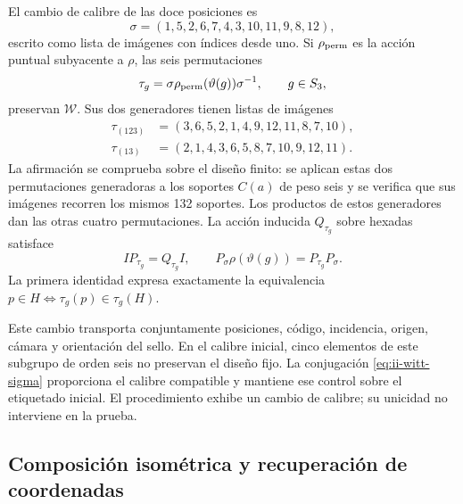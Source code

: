 El cambio de calibre de las doce posiciones es
\begin{equation}
 \sigma=(1,5,2,6,7,4,3,10,11,9,8,12),
 \label{eq:ii-witt-sigma}
\end{equation}
escrito como lista de imágenes con índices desde uno. Si
\(\rho_{\rm perm}\) es la acción puntual subyacente a \(\rho\), las
seis permutaciones
\[
 \tau_g=\sigma\rho_{\rm perm}(\vartheta(g))\sigma^{-1},\qquad g\in S_3,
\]
preservan \(\mathcal W\). Sus dos generadores tienen listas de imágenes
\[
\begin{aligned}
 \tau_{(123)}&=(3,6,5,2,1,4,9,12,11,8,7,10),\\
 \tau_{(13)}&=(2,1,4,3,6,5,8,7,10,9,12,11).
\end{aligned}
\]
La afirmación se comprueba sobre el diseño finito: se aplican estas dos
permutaciones generadoras a los soportes
\(C(a)\) de peso seis y se verifica que sus imágenes recorren los
mismos 132 soportes. Los productos de estos generadores dan las otras
cuatro permutaciones. La acción inducida \(Q_{\tau_g}\) sobre hexadas
satisface
\begin{equation}
 I P_{\tau_g}=Q_{\tau_g}I,
 \qquad
 P_\sigma\rho(\vartheta(g))=P_{\tau_g}P_\sigma.
 \label{eq:ii-witt-recalibration}
\end{equation}
La primera identidad expresa exactamente la equivalencia
\(p\in H\Longleftrightarrow\tau_g(p)\in\tau_g(H)\).

Este cambio transporta conjuntamente posiciones, código, incidencia,
origen, cámara y orientación del sello. En el calibre inicial, cinco
elementos de este subgrupo de orden seis no preservan el diseño fijo.
La conjugación \eqref{eq:ii-witt-sigma} proporciona el calibre compatible
y mantiene ese control sobre el etiquetado inicial. El procedimiento
exhibe un cambio de calibre; su unicidad no interviene en la prueba.

\subsection{Composición isométrica y recuperación de coordenadas}

